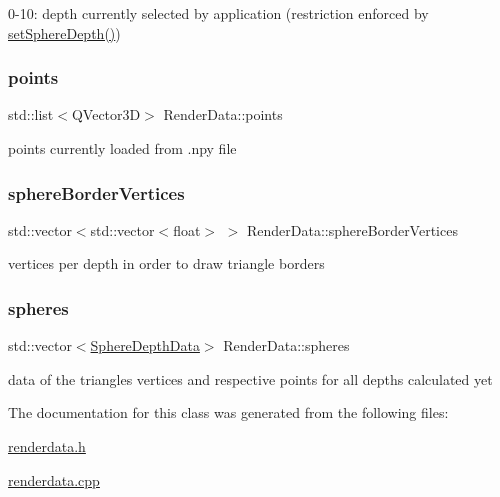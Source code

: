 0-\/10\+: depth currently selected by application (restriction enforced by \hyperlink{class_render_data_a8d5f7285d29dc9ca0f93fcf2b5826283}{set\+Sphere\+Depth()}) 

\mbox{\label{class_render_data_aaab890b2c9bac7bb08d5f257e98a7cb9}} 
\subsubsection{\texorpdfstring{points}{points}}
{\footnotesize\ttfamily std\+::list$<$Q\+Vector3D$>$ Render\+Data\+::points\hspace{0.3cm}{\ttfamily [private]}}



points currently loaded from .npy file 

\mbox{\label{class_render_data_aadf6eefa26ab7f440571b651d38d6e0e}} 
\subsubsection{\texorpdfstring{sphere\+Border\+Vertices}{sphereBorderVertices}}
{\footnotesize\ttfamily std\+::vector$<$std\+::vector$<$float$>$ $>$ Render\+Data\+::sphere\+Border\+Vertices\hspace{0.3cm}{\ttfamily [private]}}



vertices per depth in order to draw triangle borders 

\mbox{\label{class_render_data_af8d7292450ad6bba825a6dbb75be217c}} 
\subsubsection{\texorpdfstring{spheres}{spheres}}
{\footnotesize\ttfamily std\+::vector$<$\hyperlink{struct_sphere_depth_data}{Sphere\+Depth\+Data}$>$ Render\+Data\+::spheres\hspace{0.3cm}{\ttfamily [private]}}



data of the triangles\textquotesingle{} vertices and respective points for all depths calculated yet 



The documentation for this class was generated from the following files\+:\begin{DoxyCompactItemize}
\item 
\hyperlink{renderdata_8h}{renderdata.\+h}\item 
\hyperlink{renderdata_8cpp}{renderdata.\+cpp}\end{DoxyCompactItemize}
